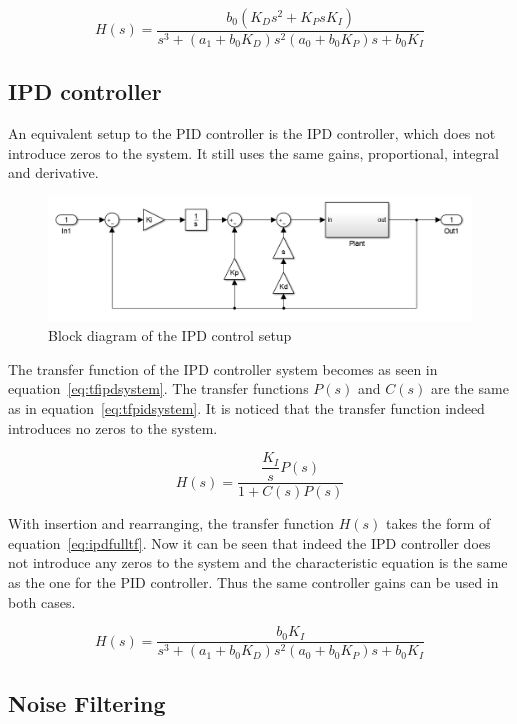\begin{equation}
\label{eq:pidfulltf}
H(s) = \dfrac{b_0 (K_D s^2 + K_P s K_I)}{s^3 + (a_1 + b_0 K_D)s^2 (a_0 + b_0 K_P)s + b_0 K_I }
\end{equation}


\subsection{IPD controller}
An equivalent setup to the PID controller is the IPD controller, which does not introduce zeros to the system. It still uses the same gains, proportional, integral and derivative.

\begin{figure}[!h]
	\centering
	\includegraphics[width=1\linewidth]{graphics/ipdcontroller}
	\caption{Block diagram of the IPD control setup}
	\label{fig:ipdcontrolsystem}	
\end{figure}

The transfer function of the IPD controller system becomes as seen in equation~\ref{eq:tfipdsystem}. The transfer functions $P(s)$ and $C(s)$ are the same as in equation~\ref{eq:tfpidsystem}. It is noticed that the transfer function indeed introduces no zeros to the system.

\begin{equation}
\label{eq:tfipdsystem}
H(s) = \dfrac{\dfrac{K_I}{s} P(s)}{1+C(s)P(s)}
\end{equation}

With insertion and rearranging, the transfer function $H(s)$ takes the form of equation~\ref{eq:ipdfulltf}. Now it can be seen that indeed the IPD controller does not introduce any zeros to the system and the characteristic equation is the same as the one for the PID controller. Thus the same controller gains can be used in both cases.

\begin{equation}
\label{eq:ipdfulltf}
H(s) = \dfrac{b_0 K_I}{s^3 + (a_1 + b_0 K_D)s^2 (a_0 + b_0 K_P)s + b_0 K_I }
\end{equation}

\subsection{Noise Filtering}


